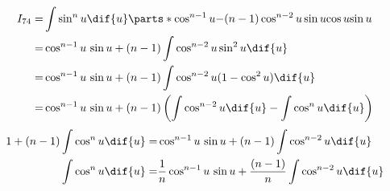 \def\no{74}
\def\theintegral{\(\int\cos^n{u}\;\dif{u}
\enspace=\enspace%
\tfrac{1}{n}\,\cos^{n-1}{u}\;\sin{u}
\,+\,
\tfrac{n-1}{n}\,\int\cos^{n-2}u\;\dif{u}
\)}

\begin{align*}
{I}_{\no}
=&  \int\sin^n{u}\dif{u}
\parts*
  { \cos^{n-1}u} {  -(n-1)\cos^{n-2}{u}\sin{u}  }%
  { \cos u  }     {  \sin u  } \\
=& \cos^{n-1}{u}\,\sin{u} + (n-1)\int \cos^{n-2}{u}\sin^2{u}\dif{u}\\
=& \cos^{n-1}{u}\,\sin{u} + (n-1)\int \cos^{n-2}{u}(1-\cos^2{u})\dif{u}\\
=& \cos^{n-1}{u}\,\sin{u} + (n-1)
    \left(
        \int \cos^{n-2}{u}\dif{u} - \int \cos^{n}{u} \dif{u}
    \right)
\end{align*}
\begin{align*}
1+(n-1)\int\cos^n{u}\dif{u}
=& \cos^{n-1}{u}\,\sin{u} + (n-1)\int \cos^{n-2}{u}\dif{u} \\
\int\cos^n{u}\dif{u}
=& \frac{1}{n}\cos^{n-1}{u}\,\sin{u} + \frac{(n-1)}{n}\int \cos^{n-2}{u}\dif{u}
\end{align*}
